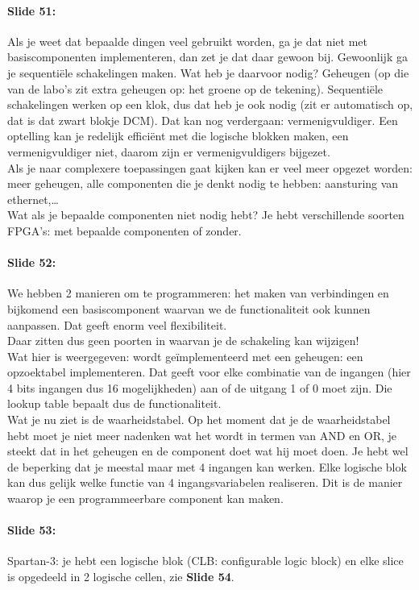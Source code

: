 \documentclass[10pt,a4paper]{book}
\begin{document}
\paragraph{Slide 51:} Als je weet dat bepaalde dingen veel gebruikt worden, ga je dat niet met basiscomponenten implementeren, dan zet je dat daar gewoon bij. Gewoonlijk ga je sequenti\"ele schakelingen maken. Wat heb je daarvoor nodig? Geheugen (op die van de labo's zit extra geheugen op: het groene op de tekening). Sequenti\"ele schakelingen werken op een klok, dus dat heb je ook nodig (zit er automatisch op, dat is dat zwart blokje DCM). Dat kan nog verdergaan: vermenigvuldiger. Een optelling kan je redelijk effici\"ent met die logische blokken maken, een vermenigvuldiger niet, daarom zijn er vermenigvuldigers bijgezet.\\
Als je naar complexere toepassingen gaat kijken kan er veel meer opgezet worden: meer geheugen, alle componenten die je denkt nodig te hebben: aansturing van ethernet,\ldots \\
Wat als je bepaalde componenten niet nodig hebt? Je hebt verschillende soorten FPGA's: met bepaalde componenten of zonder. 

\paragraph{Slide 52:} We hebben 2 manieren om te programmeren: het maken van verbindingen en bijkomend een basiscomponent waarvan we de functionaliteit ook kunnen aanpassen. Dat geeft enorm veel flexibiliteit.\\
Daar zitten dus geen poorten in waarvan je de schakeling kan wijzigen!\\
Wat hier is weergegeven: wordt ge\"implementeerd met een geheugen: een opzoektabel implementeren. Dat geeft voor elke combinatie van de ingangen (hier 4 bits ingangen dus 16 mogelijkheden) aan of de uitgang 1 of 0 moet zijn. Die lookup table bepaalt dus de functionaliteit.\\
Wat je nu ziet is de waarheidstabel. Op het moment dat je de waarheidstabel hebt moet je niet meer nadenken wat het wordt in termen van AND en OR, je steekt dat in het geheugen en de component doet wat hij moet doen. Je hebt wel de beperking dat je meestal maar met 4 ingangen kan werken. Elke logische blok kan dus gelijk welke functie van 4 ingangsvariabelen realiseren.
Dit is de manier waarop je een programmeerbare component kan maken.

\paragraph{Slide 53:} Spartan-3: je hebt een logische blok (CLB: configurable logic block) en elke slice is opgedeeld in 2 logische cellen, zie \textbf{Slide 54}.
\end{document}

